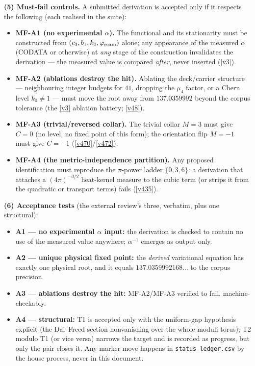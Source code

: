 \par\smallskip\noindent\textbf{(5) Must-fail controls.} A submitted derivation is accepted only
if it respects the following (each realised in the suite):
\begin{itemize}
\item \textbf{MF-A1 (no experimental $\alpha$).} The functional and its stationarity must be
  constructed from $(c_3, b_1, k_0, \varphi_{\mathrm{seam}})$ alone; any appearance of the
  measured $\alpha$ (CODATA or otherwise) at \emph{any} stage of the construction invalidates
  the derivation --- the measured value is compared \emph{after}, never inserted
  (\vref{v3}).
\item \textbf{MF-A2 (ablations destroy the hit).} Ablating the deck/carrier structure ---
  neighbouring integer budgets for $41$, dropping the $\mu_4$ factor, or a Chern level
  $k_0\neq1$ --- must move the root away from $137.0359992$ beyond the corpus tolerance
  (the \vref{v3} ablation battery; \vref{v48}).
\item \textbf{MF-A3 (trivial/reversed collar).} The trivial collar $M=3$ must give $C=0$ (no
  level, no fixed point of this form); the orientation flip $M=-1$ must give $C=-1$
  (\vref{v470}/\vref{v472}).
\item \textbf{MF-A4 (the metric-independence partition).} Any proposed identification must
  reproduce the $\pi$-power ladder $\{0,3,6\}$: a derivation that attaches a
  $(4\pi)^{-d/2}$ heat-kernel measure to the cubic term (or strips it from the quadratic or
  transport terms) fails (\vref{v435}).
\end{itemize}

\par\smallskip\noindent\textbf{(6) Acceptance tests} (the external review's three, verbatim, plus
one structural):
\begin{itemize}
\item \textbf{A1 --- no experimental $\alpha$ input:} the derivation is checked to contain no
  use of the measured value anywhere; $\alpha^{-1}$ emerges as output only.
\item \textbf{A2 --- unique physical fixed point:} the \emph{derived} variational equation has
  exactly one physical root, and it equals $137.0359992168\ldots$ to the corpus precision.
\item \textbf{A3 --- ablations destroy the hit:} MF-A2/MF-A3 verified to fail, machine-checkably.
\item \textbf{A4 --- structural:} T1 is accepted only with the uniform-gap hypothesis explicit
  (the Dai--Freed section nonvanishing over the whole moduli torus); T2 modulo T1 (or vice
  versa) narrows the target and is recorded as progress, but only the pair closes it. Any
  marker move happens in \texttt{status\_ledger.csv} by the house process, never in this
  document.
\end{itemize}

